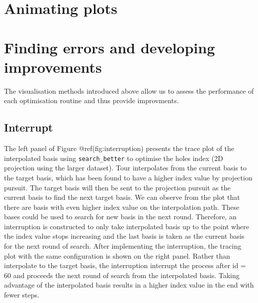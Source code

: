 \documentclass[12pt]{article}
\newenvironment{Shaded}{\begin{snugshade}}{\end{snugshade}}
\newcommand{\DataTypeTok}[1]{\textcolor[rgb]{0.13,0.29,0.53}{#1}}
\newcommand{\KeywordTok}[1]{\textcolor[rgb]{0.13,0.29,0.53}{\textbf{#1}}}
\newcommand{\NormalTok}[1]{#1}
\newcommand{\OperatorTok}[1]{\textcolor[rgb]{0.81,0.36,0.00}{\textbf{#1}}}
\newcommand{\OtherTok}[1]{\textcolor[rgb]{0.56,0.35,0.01}{#1}}
\newcommand{\StringTok}[1]{\textcolor[rgb]{0.31,0.60,0.02}{#1}}
\begin{document}
\hypertarget{animating-plots}{%
\section{Animating plots}\label{animating-plots}}

\begin{Shaded}
\end{Shaded}

\hypertarget{finding-errors-and-developing-improvements}{%
\section{Finding errors and developing
improvements}\label{finding-errors-and-developing-improvements}}

The visualisation methods introduced above allow us to assess the
performance of each optimisation routine and thus provide improvments.

\hypertarget{interrupt}{%
\subsection{Interrupt}\label{interrupt}}

The left panel of Figure @ref(fig:interruption) presents the trace plot
of the interpolated basis using \texttt{search\_better} to optimise the
holes index (2D projection using the larger dataset). Tour interpolates
from the current basis to the target basis, which has been found to have
a higher index value by projection pursuit. The target basis will then
be sent to the projection pursuit as the current basis to find the next
target basis. We can observe from the plot that there are basis with
even higher index value on the interpolation path. These bases could be
used to search for new basis in the next round. Therefore, an
interruption is constructed to only take interpolated basis up to the
point where the index value stops increasing and the last basis is taken
as the current basis for the next round of search. After implementing
the interruption, the tracing plot with the same configuration is shown
on the right panel. Rather than interpolate to the target basis, the
interruption interrupt the process after id = 60 and proceeds the next
round of search from the interpolated basis. Taking advantage of the
interpolated basis results in a higher index value in the end with fewer
steps.
\end{document}

